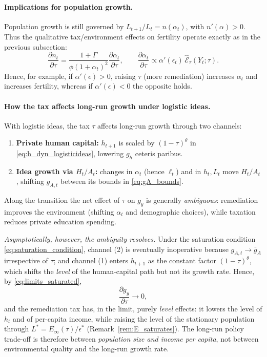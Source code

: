 \documentclass[11pt]{article}
\begin{document}
\paragraph{Implications for population growth.}
Population growth is still governed by $L_{t+1}/L_t=n(\alpha_t)$, with $n'(\alpha)>0$.
Thus the qualitative tax/environment effects on fertility operate exactly as in the previous subsection:
\[
\frac{\partial n_t}{\partial \tau}
=\frac{1+\Gamma}{\phi(1+\alpha_t)^2}\frac{\partial \alpha_t}{\partial \tau},
\qquad
\frac{\partial \alpha_t}{\partial \tau}
\propto \alpha'(\epsilon_t)\,\widehat{\mathcal{E}}_\tau(Y_t;\tau).
\]
Hence, for example, if $\alpha'(\epsilon)>0$, raising $\tau$ (more remediation) increases $\alpha_t$ and increases fertility,
whereas if $\alpha'(\epsilon)<0$ the opposite holds.

\paragraph{How the tax affects long-run growth under logistic ideas.}
With logistic ideas, the tax $\tau$ affects long-run growth through two channels:
\begin{enumerate}
\item \textbf{Private human capital:} $h_{t+1}$ is scaled by $(1-\tau)^\theta$ in \eqref{eq:h_dyn_logisticideas}, lowering $g_h$ ceteris paribus.
\item \textbf{Idea growth via $H_t/A_t$:} changes in $\alpha_t$ (hence $\ell_t$) and in $h_t,L_t$ move $H_t/A_t$, shifting $g_{A,t}$
between its bounds in \eqref{eq:gA_bounds}.
\end{enumerate}
Along the transition the net effect of $\tau$ on $g_y$ is generally \emph{ambiguous}: remediation
improves the environment (shifting $\alpha_t$ and demographic choices), while taxation reduces
private education spending.

\emph{Asymptotically, however, the ambiguity resolves.} Under the saturation condition
\eqref{eq:saturation_condition}, channel (2) is eventually inoperative because $g_{A,t}\to\bar g_A$
irrespective of $\tau$; and channel (1) enters $h_{t+1}$ as the constant factor $(1-\tau)^\theta$,
which shifts the \emph{level} of the human-capital path but not its growth rate. Hence, by
\eqref{eq:limits_saturated},
\[
\frac{\partial g_y}{\partial \tau}\longrightarrow 0,
\]
and the remediation tax has, in the limit, purely \emph{level} effects: it lowers the level of $h_t$
and of per-capita income, while raising the level of the stationary population through
$L^\ast=E_\infty(\tau)/\epsilon^\ast$ (Remark~\ref{rem:E_saturates}). The long-run policy trade-off
is therefore between \emph{population size and income per capita}, not between environmental quality
and the long-run growth rate.
\end{document}
